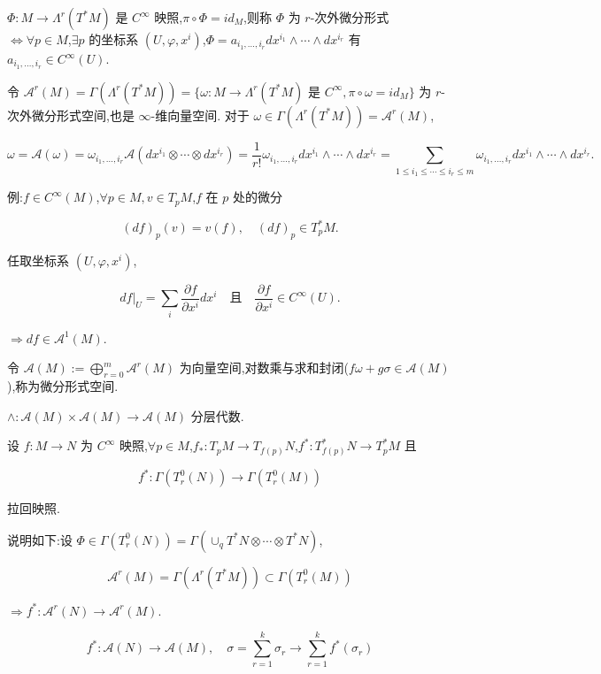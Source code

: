 \begin{definition}
$\Phi : M \rightarrow \Lambda^r(T^*M)$ 是 $C^\infty$ 映照,$\pi \circ \Phi = id_M$,则称 $\Phi$ 为 $r$-次外微分形式 $\iff \forall p \in M$,$\exists p$ 的坐标系 $(U, \varphi, x^i)$,$\Phi = a_{i_1, \ldots, i_r} dx^{i_1} \wedge \cdots \wedge dx^{i_r}$ 有 $a_{i_1, \ldots, i_r} \in C^\infty(U)$.
\end{definition}

令 $\mathcal{A}^r(M) = \Gamma(\Lambda^r(T^*M)) = \{\omega : M \rightarrow \Lambda^r(T^*M) \text{ 是 } C^\infty, \pi \circ \omega = id_M\}$ 为 $r$-次外微分形式空间,也是 $\infty$-维向量空间.
对于 $\omega \in \Gamma(\Lambda^r(T^*M)) = \mathcal{A}^r(M)$,

\[
\omega = \mathcal{A}(\omega) = \omega_{i_1, \ldots, i_r} \mathcal{A}(dx^{i_1} \otimes \cdots \otimes dx^{i_r}) = \frac{1}{r!} \omega_{i_1, \ldots, i_r} dx^{i_1} \wedge \cdots \wedge dx^{i_r} = \sum_{1 \leq i_1 \leq \cdots \leq i_r \leq m} \omega_{i_1, \ldots, i_r} dx^{i_1} \wedge \cdots \wedge dx^{i_r}.
\]

例:$f \in C^\infty(M)$,$\forall p \in M, v \in T_p M$,$f$ 在 $p$ 处的微分

\[
(df)_p(v) = v(f), \quad (df)_p \in T_p^*M.
\]

任取坐标系 $(U, \varphi, x^i)$,

\[
df|_U = \sum_i \frac{\partial f}{\partial x^i} dx^i \quad \text{且} \quad \frac{\partial f}{\partial x^i} \in C^\infty(U).
\]

$\Rightarrow df \in \mathcal{A}^1(M)$.

令 $\mathcal{A}(M) := \bigoplus_{r=0}^m \mathcal{A}^r(M)$ 为向量空间,对数乘与求和封闭($f\omega + g\sigma \in \mathcal{A}(M)$),称为微分形式空间.

$\wedge: \mathcal{A}(M) \times \mathcal{A}(M) \rightarrow \mathcal{A}(M)$ 分层代数.

设 $f : M \to N$ 为 $C^\infty$ 映照,$\forall p \in M$,$f_* : T_pM \to T_{f(p)}N$,$f^* : T_{f(p)}^*N \to T_p^*M$ 且

\[
f^* : \Gamma(T_r^0(N)) \rightarrow \Gamma(T_r^0(M))
\]

拉回映照.

说明如下:设 $\Phi \in \Gamma(T_r^0(N)) = \Gamma(\cup_q T^*N \otimes \cdots \otimes T^*N)$,

\[
\mathcal{A}^r(M) = \Gamma(\Lambda^r(T^*M)) \subset \Gamma(T_r^0(M))
\]

$\Rightarrow f^* : \mathcal{A}^r(N) \rightarrow \mathcal{A}^r(M)$.

\[
f^* : \mathcal{A}(N) \rightarrow \mathcal{A}(M), \quad \sigma = \sum_{r=1}^k \sigma_r \rightarrow \sum_{r=1}^k f^*(\sigma_r)
\]


